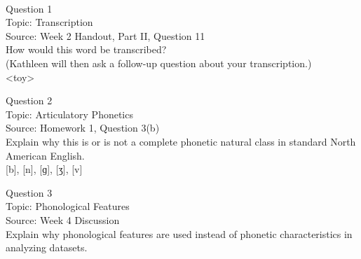 \documentclass[12pt]{article}
\begin{document}
\newpage

\begin{center}
\textbf{{\color{red}{\HUGE END OF EXAM}}}\\

\end{center}
\newpage

\begin{center}
\textbf{{\color{blue}{\HUGE START OF EXAM\\}}}

\textbf{{\color{blue}{\HUGE Student ID: 68058\\}}}

\textbf{{\color{blue}{\HUGE \\}}}

\end{center}
\newpage

{\large Question 1}\\

Topic: Transcription\\
Source: Week 2 Handout, Part II, Question 11\\

How would this word be transcribed?\\ (Kathleen will then ask a follow-up question about your transcription.)\\

<toy>


\newpage

{\large Question 2}\\

Topic: Articulatory Phonetics\\
Source: Homework 1, Question 3(b)\\

Explain why this is or is not a complete phonetic natural class in standard North American English.\\

{[b]}, {[n]}, {[ɡ]}, {[ʒ]}, {[v]}


\newpage

{\large Question 3}\\

Topic: Phonological Features\\
Source: Week 4 Discussion\\

Explain why phonological features are used instead of phonetic characteristics in analyzing datasets.\\


\newpage
\end{document}
